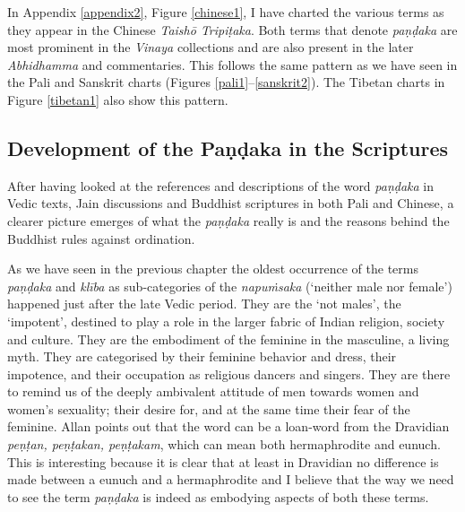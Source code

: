 In Appendix \ref{appendix2}, Figure \ref{chinese1}, I have charted the various terms as they appear in the Chinese \textit{Taishō Tripiṭaka}. Both terms that denote \textit{paṇḍaka} are most prominent in the \textit{Vinaya} collections and are also present in the later \textit{Abhidhamma} and commentaries. This follows the same pattern as we have seen in the Pali and Sanskrit charts (Figures \ref{pali1}–\ref{sanskrit2}). The Tibetan charts in Figure \ref{tibetan1} also show this pattern.

\subsection{Development of the Paṇḍaka in the Scriptures}
After having looked at the references and descriptions of the word \textit{paṇḍaka} in Vedic texts, Jain discussions and Buddhist scriptures in both Pali and Chinese, a clearer picture emerges of what the \textit{paṇḍaka} really is and the reasons behind the Buddhist rules against ordination.

As we have seen in the previous chapter the oldest occurrence of the terms \textit{paṇḍaka} and \textit{klība} as sub-categories of the \textit{napuṁsaka} (`neither male nor female') happened just after the late Vedic period. They are the `not males', the `impotent', destined to play a role in the larger fabric of Indian religion, society and culture. They are the embodiment of the feminine in the masculine, a living myth. They are categorised by their feminine behavior and dress, their impotence, and their occupation as religious dancers and singers. They are there to remind us of the deeply ambivalent attitude of men towards women and women's sexuality; their desire for, and at the same time their fear of the feminine. Allan \cite{bomhard} points out that the word can be a loan-word from the Dravidian \textit{peṇṭan, peṇṭakan, peṇṭakam}, which can mean both hermaphrodite and eunuch. This is interesting because it is clear that at least in Dravidian no difference is made between a eunuch and a hermaphrodite and I believe that the way we need to see the term \textit{paṇḍaka} is indeed as embodying aspects of both these terms.

